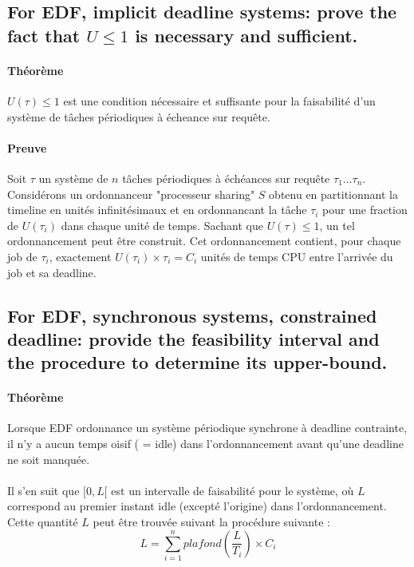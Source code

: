 \subsection{For EDF, implicit deadline systems: prove the fact that \texorpdfstring{$U \leq 1$}{Lg} is necessary and sufficient.}
\paragraph{Théorème} 
$U(\tau) \leq 1$ est une condition nécessaire et suffisante pour la faisabilité d'un système de tâches périodiques à écheance sur requête.

\paragraph{Preuve} Soit $\tau$ un système de $n$ tâches périodiques à échéances sur requête $\tau_{1}...\tau_{n}$.
Considérons un ordonnanceur "processeur sharing" $S$ obtenu en partitionnant la timeline en unités infinitésimaux et en ordonnancant la tâche $\tau_{i}$ pour une fraction de $U(\tau_{i})$ dans chaque unité de temps. Sachant que $U(\tau) \leq 1$, un tel ordonnancement peut être construit. Cet ordonnancement contient, pour chaque job de $\tau_{i}$, exactement $U(\tau_{i}) \times \tau_{i} = C_{i}$ unités de temps CPU entre l'arrivée du job et sa deadline.

\subsection{For EDF, synchronous systems, constrained deadline: provide the feasibility interval and the procedure to determine its upper-bound.}
\paragraph{Théorème} Lorsque EDF ordonnance un système périodique synchrone à deadline contrainte, il n'y a aucun temps oisif ( = idle) dans l'ordonnancement avant qu'une deadline ne soit manquée.

\paragraph{} 
Il s'en suit que $[0, L[$ est un intervalle de faisabilité pour le système, où  $L$ correspond au premier instant idle (excepté l'origine) dans l'ordonnancement. Cette quantité $L$ peut être trouvée suivant la procédure suivante : 
\begin{equation}
L = \sum_{i=1}^{n}plafond \left( \frac{L}{T_{i}} \right) \times C_{i}
\end{equation}
